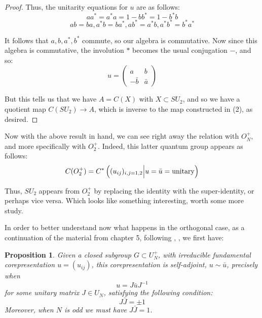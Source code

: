\documentclass[12pt]{amsbook}
\newtheorem{proposition}[theorem]{Proposition}
\begin{document}
\begin{proof}
Thus, the unitarity equations for $u$ are as follows:
$$aa^*=a^*a=1-bb^*=1-b^*b$$
$$ab=ba,a^*b=ba^*,ab^*=a^*b,a^*b^*=b^*a^*$$

It follows that $a,b,a^*,b^*$ commute, so our algebra is commutative. Now since this algebra is commutative, the involution $*$ becomes the usual conjugation $-$, and so:
$$u=\begin{pmatrix}a&b\\-\bar{b}&\bar{a}\end{pmatrix}$$

But this tells us that we have $A=C(X)$ with $X\subset SU_2$, and so we have a quotient map $C(SU_2)\to A$, which is inverse to the map constructed in (2), as desired.
\end{proof}

Now with the above result in hand, we can see right away the relation with $O_N^+$, and more specifically with $O_2^+$. Indeed, this latter quantum group appears as follows:
$$C(O_2^+)=C^*\left((u_{ij})_{i,j=1,2}\Big|u=\bar{u}={\rm unitary}\right)$$

Thus, $SU_2$ appears from $O_2^+$ by replacing the identity with the super-identity, or perhaps vice versa. Which looks like something interesting, worth some more study.

\bigskip

In order to better understand now what happens in the orthogonal case, as a continuation of the material from chapter 5, following \cite{ba1}, \cite{bdv}, we first have:

\begin{proposition}
Given a closed subgroup $G\subset U_N^+$, with irreducible fundamental corepresentation $u=(u_{ij})$, this corepresentation is self-adjoint, $u\sim\bar{u}$, precisely when 
$$u=J\bar{u}J^{-1}$$
for some unitary matrix $J\in U_N$, satisfying the following condition:
$$J\bar{J}=\pm 1$$
Moreover, when $N$ is odd we must have $J\bar{J}=1$. 
\end{proposition}
\end{document}
